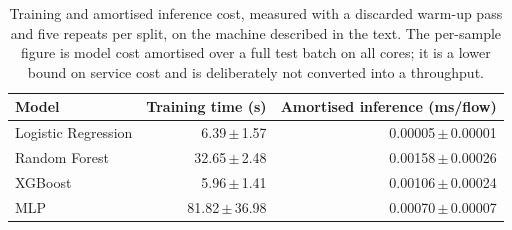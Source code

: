 \begin{table}[htbp]
\centering
\caption{Training and amortised inference cost, measured with a discarded warm-up pass and five repeats per split, on the machine described in the text. The per-sample figure is model cost amortised over a full test batch on all cores; it is a lower bound on service cost and is deliberately not converted into a throughput.}
\label{tab:cost}
\footnotesize
\begin{tabular}{lrr}
\hline
Model & Training time (s) & Amortised inference (ms/flow) \\
\hline
Logistic Regression & 6.39\,$\pm$\,1.57 & 0.00005\,$\pm$\,0.00001 \\
Random Forest & 32.65\,$\pm$\,2.48 & 0.00158\,$\pm$\,0.00026 \\
XGBoost & 5.96\,$\pm$\,1.41 & 0.00106\,$\pm$\,0.00024 \\
MLP & 81.82\,$\pm$\,36.98 & 0.00070\,$\pm$\,0.00007 \\
\hline
\end{tabular}
\end{table}
